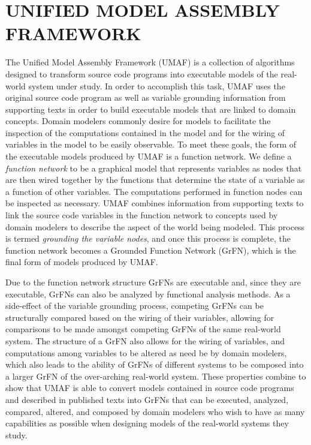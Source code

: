 \chapter{UNIFIED MODEL ASSEMBLY FRAMEWORK\label{chapter:umaf}}
The Unified Model Assembly Framework (UMAF) is a collection of algorithms designed to transform source code programs into executable models of the real-world system under study.
In order to accomplish this task, UMAF uses the original source code program as well as variable grounding information from supporting texts in order to build executable models that are linked to domain concepts.
Domain modelers commonly desire for models to facilitate the inspection of the computations contained in the model and for the wiring of variables in the model to be easily observable.
To meet these goals, the form of the executable models produced by UMAF is a function network.
We define a \emph{function network} to be a graphical model that represents variables as nodes that are then wired together by the functions that determine the state of a variable as a function of other variables. The computations performed in function nodes can be inspected as necessary.
UMAF combines information from supporting texts to link the source code variables in the function network to concepts used by domain modelers to describe the aspect of the world being modeled.
This process is termed \textit{grounding the variable nodes}, and once this process is complete, the function network becomes a Grounded Function Network (GrFN), which is the final form of models produced by UMAF.

Due to the function network structure GrFNs are executable and, since they are executable, GrFNs can also be analyzed by functional analysis methods.
As a side-effect of the variable grounding process, competing GrFNs can be structurally compared based on the wiring of their variables, allowing for comparisons to be made amongst competing GrFNs of the same real-world system.
The structure of a GrFN also allows for the wiring of variables, and computations among variables to be altered as need be by domain modelers, which also leads to the ability of GrFNs of different systems to be composed into a larger GrFN of the over-arching real-world system.
These properties combine to show that UMAF is able to convert models contained in source code programs and described in published texts into GrFNs that can be executed, analyzed, compared, altered, and composed by domain modelers who wish to have as many capabilities as possible when designing models of the real-world systems they study.

